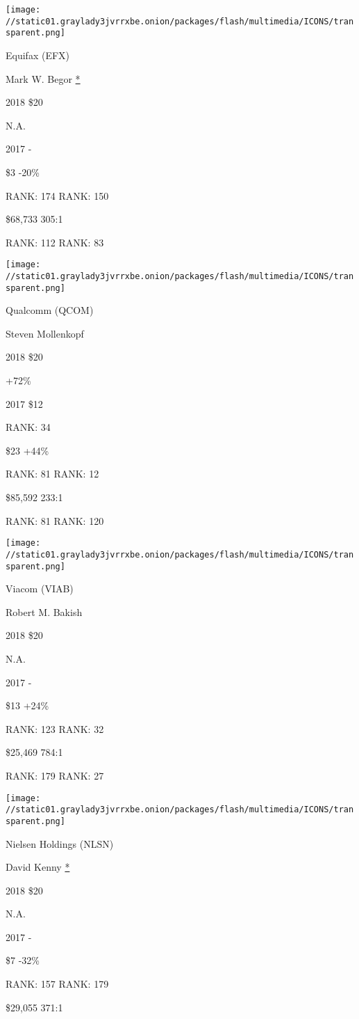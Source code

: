 \texttt{[image: //static01.graylady3jvrrxbe.onion/packages/flash/multimedia/ICONS/transparent.png]}

Equifax (EFX)

Mark W. Begor \protect\hyperlink{g-footnotes}{*}

2018 \$20

 N.A.

2017 -

 \$3 -20\%

RANK: 174 RANK: 150

 \$68,733 305:1

RANK: 112 RANK: 83

\texttt{[image: //static01.graylady3jvrrxbe.onion/packages/flash/multimedia/ICONS/transparent.png]}

Qualcomm (QCOM)

Steven Mollenkopf \protect\hyperlink{g-footnotes}{}

2018 \$20

 +72\%

2017 \$12

RANK: 34

 \$23 +44\%

RANK: 81 RANK: 12

 \$85,592 233:1

RANK: 81 RANK: 120

\texttt{[image: //static01.graylady3jvrrxbe.onion/packages/flash/multimedia/ICONS/transparent.png]}

Viacom (VIAB)

Robert M. Bakish \protect\hyperlink{g-footnotes}{}

2018 \$20

 N.A.

2017 -

 \$13 +24\%

RANK: 123 RANK: 32

 \$25,469 784:1

RANK: 179 RANK: 27

\texttt{[image: //static01.graylady3jvrrxbe.onion/packages/flash/multimedia/ICONS/transparent.png]}

Nielsen Holdings (NLSN)

David Kenny \protect\hyperlink{g-footnotes}{*}

2018 \$20

 N.A.

2017 -

 \$7 -32\%

RANK: 157 RANK: 179

 \$29,055 371:1

